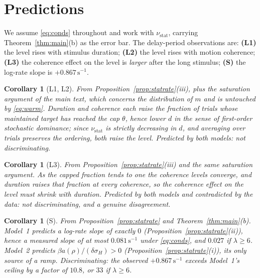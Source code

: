 \documentclass[11pt,a4paper]{article}
\newtheorem{corollary}[proposition]{Corollary}
\theoremstyle{remark}\newtheorem{remark}[proposition]{Remark}
\newcommand{\nustat}{\nu_{\mathrm{stat}}}
\begin{document}
\section{Predictions}\label{sec:pred}

We assume \eqref{eq:conds} throughout and work with $\nustat$, carrying
Theorem~\ref{thm:main}(b) as the error bar. The delay-period observations are:
\textbf{(L1)} the level rises with stimulus duration; \textbf{(L2)} the level rises
with motion coherence; \textbf{(L3)} the coherence effect on the level is
\emph{larger} after the long stimulus; \textbf{(S)} the log-rate slope is
$+0.867\,\mathrm{s}^{-1}$.

\begin{corollary}[L1, L2]\label{cor:P1}
\emph{From Proposition~\ref{prop:statrate}(iii), plus the saturation argument of the
main text, which concerns the distribution of $m$ and is untouched by
\eqref{eq:warm}.}
Duration and coherence each raise the fraction of trials whose maintained target has
reached the cap $\theta$, hence lower $d$ in the sense of first-order stochastic
dominance; since $\nustat$ is strictly decreasing in $d$, and averaging over trials
preserves the ordering, both raise the level. Predicted by \emph{both} models:
\emph{not discriminating}.
\end{corollary}

\begin{corollary}[L3]\label{cor:P2}
\emph{From Proposition~\ref{prop:statrate}(iii) and the same saturation argument.}
As the capped fraction tends to one the coherence levels converge, and duration raises
that fraction at every coherence, so the coherence effect on the level must
\emph{shrink} with duration. Predicted by both models and \emph{contradicted} by the
data: not discriminating, and a genuine disagreement.
\end{corollary}

\begin{corollary}[S]\label{cor:P3}
\emph{From Proposition~\ref{prop:statrate} and Theorem~\ref{thm:main}(b).}
Model~1 predicts a log-rate slope of exactly $0$
(Proposition~\ref{prop:statrate}(ii)), hence a measured slope of at most
$0.081\,\mathrm{s}^{-1}$ under \eqref{eq:conds}, and $0.027$ if $\lambda\ge6$.
Model~2 predicts $\beta a(\rho)/(\delta\sigma_H)>0$
(Proposition~\ref{prop:statrate}(i)), its only source of a ramp.
\emph{Discriminating: the observed $+0.867\,\mathrm{s}^{-1}$ exceeds Model~1's
ceiling by a factor of $10.8$, or $33$ if $\lambda\ge6$.}
\end{corollary}
\end{document}
